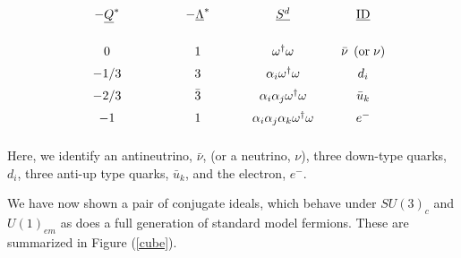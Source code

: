 \documentclass[letterpaper,12pt,titlepage,oneside,final]{book}
\newcommand{\oto}{\omega ^{\dagger}\omega }
\newcommand{\spacer}{0.2cm}
\begin{document}
\begin{equation}\begin{array}{cccc}\label{downcharge}
\hspace{.75cm}-\underline{Q}^*\hspace{.75cm}   &    \hspace{.75cm}\boldmath{-\underline{\Lambda}^*} \hspace{.75cm}&\hspace{.75cm} \underline{S^{d}} \hspace{.75cm}& \hspace{.75cm}\underline{\textup{ID}} \hspace{.75cm}\vspace{6mm}\\

0 & 1 & \oto&\bar{\nu} \hspace{1mm} \left(\textup{or}\hspace{1mm} \nu\right)   \vspace{\spacer}\\

-1/3 & 3 & \alpha_i\oto & d_i\vspace{\spacer}\\

-2/3 & \bar{3} &  \alpha_i\alpha_j \oto & \bar{u}_k \vspace{\spacer}\\

-1 & 1 & \alpha_i\alpha_j \alpha_k\oto   & e^-   \vspace{\spacer}
\end{array}\end{equation}

\noindent Here, we identify an antineutrino, $\bar{\nu}$, (or a neutrino, $\nu$), three down-type quarks, $d_i$,  three anti-up type quarks, $\bar{u}_k$, and the electron, $e^-$.  




We have now shown a pair of conjugate ideals, which behave under $SU(3)_c$ and $U(1)_{em}$ as does a full generation of  standard model fermions.   These are summarized in Figure (\ref{cube}).
\end{document}

